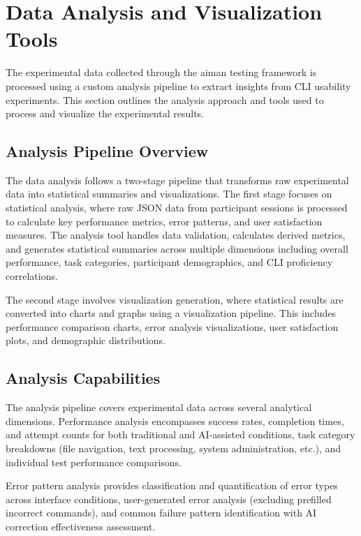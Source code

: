 \section{Data Analysis and Visualization Tools}

The experimental data collected through the aiman testing framework is processed using a custom analysis pipeline to extract insights from CLI usability experiments. This section outlines the analysis approach and tools used to process and visualize the experimental results.

\subsection{Analysis Pipeline Overview}

The data analysis follows a two-stage pipeline that transforms raw experimental data into statistical summaries and visualizations. The first stage focuses on statistical analysis, where raw JSON data from participant sessions is processed to calculate key performance metrics, error patterns, and user satisfaction measures. The analysis tool handles data validation, calculates derived metrics, and generates statistical summaries across multiple dimensions including overall performance, task categories, participant demographics, and CLI proficiency correlations.

The second stage involves visualization generation, where statistical results are converted into charts and graphs using a visualization pipeline. This includes performance comparison charts, error analysis visualizations, user satisfaction plots, and demographic distributions.

\subsection{Analysis Capabilities}

The analysis pipeline covers experimental data across several analytical dimensions. Performance analysis encompasses success rates, completion times, and attempt counts for both traditional and AI-assisted conditions, task category breakdowns (file navigation, text processing, system administration, etc.), and individual test performance comparisons.

Error pattern analysis provides classification and quantification of error types across interface conditions, user-generated error analysis (excluding prefilled incorrect commands), and common failure pattern identification with AI correction effectiveness assessment.

